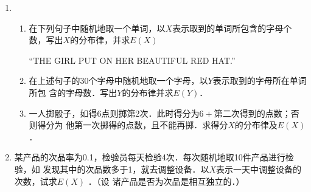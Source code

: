 \documentclass[10pt,a4paper]{article}
\begin{document}
\begin{enumerate}

    


    





    \item \begin{enumerate}
        \item 在下列句子中随机地取一个单词，以$X$表示取到的单词所包含的字母个数，写出$X$的分布律，并求$E(X)$
        \begin{center}
            “THE GIRL PUT ON HER BEAUTIFUL RED HAT.”
        \end{center}
        \item 在上述句子的30个字母中随机地取一个字母，以$Y$表示取到的字母所在单词所包
        含的字母数．写出$Y$的分布律并求$E(Y)$．
        \item 一人掷骰子，如得6点则掷第2次．此时得分为$6+\mbox{第二次得到的点数}$；否则得分为
        他第一次掷得的点数，且不能再掷．求得分$X$的分布律及$E(X)$．
    \end{enumerate}
    \vspace{8cm}


    \item 某产品的次品率为0.1，检验员每天检验4次．每次随机地取10件产品进行检验，如
    发现其中的次品数多于1，就去调整设备．以$X$表示一天中调整设备的次数，试求$E(X)$ ．（设
    诸产品是否为次品是相互独立的．）
    \vspace{10cm}



\end{enumerate}
\end{document}
